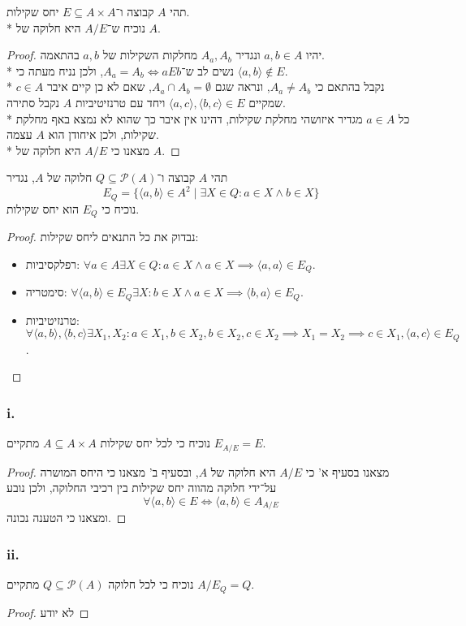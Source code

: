 \Question{}
\Subquestion{}
תהי $A$ קבוצה ו־$E \subseteq A \times A$ יחס שקילות. \\*
נוכיח ש־$A / E$ היא חלוקה של $A$.
\begin{proof}
	יהיו $a, b \in A$ ונגדיר $A_a, A_b$ מחלקות השקילות של $a, b$ בהתאמה. \\*
	נשים לב ש־$A_a = A_b \iff aEb$, ולכן נניח מעתה כי $\langle a, b \rangle \not\in E$. \\*
	נקבל בהתאם כי $A_a \ne A_b$, ונראה שגם $A_a \cap A_b = \emptyset$, שאם לא כן קיים איבר $c \in A$ שמקיים $\langle a, c \rangle, \langle b, c \rangle \in E$ ויחד עם טרנזיטיביות $A$ נקבל סתירה. \\*
	כל $a \in A$ מגדיר איזושהי מחלקת שקילות, דהינו אין איבר כך שהוא לא נמצא באף מחלקת שקילות, ולכן איחודן הוא $A$ עצמה. \\*
	מצאנו כי $A/E$ היא חלוקה של $A$.
\end{proof}

\Subquestion{}
תהי $A$ קבוצה ו־$Q \subseteq \mathcal{P}(A)$ חלוקה של $A$, נגדיר
\[
	E_Q = \{ \langle a, b \rangle \in A^2 \mid \exists X \in Q : a \in X \land b \in X \}
\]
נוכיח כי $E_Q$ הוא יחס שקילות.
\begin{proof}
	נבדוק את כל התנאים ליחס שקילות:
	\begin{itemize}
		\item רפלקסיביות: $\forall a \in A \exists X \in Q : a \in X \land a \in X \implies \langle a, a \rangle \in E_Q$.
		\item סימטריה: $\forall \langle a, b \rangle \in E_Q \exists X : b \in X \land a \in X \implies \langle b, a \rangle \in E_Q$.
		\item טרנזיטיביות: $\forall \langle a, b \rangle, \langle b, c \rangle \exists X_1, X_2 : a \in X_1, b \in X_2, b \in X_2, c \in X_2 \implies X_1 = X_2 \implies c \in X_1, \langle a, c \rangle \in E_Q$.
	\end{itemize}
\end{proof}

\Subquestion{}
\subsubsection{i.}
נוכיח כי לכל יחס שקילות $A \subseteq A \times A$ מתקיים $E_{A/E} = E$.
\begin{proof}
	מצאנו בסעיף א' כי $A/E$ היא חלוקה של $A$, ובסעיף ב' מצאנו כי היחס המושרה על־ידי חלוקה מהווה יחס שקילות בין רכיבי החלוקה, ולכן נובע
	\[
		\forall \langle a, b \rangle \in E \iff \langle a, b \rangle \in A_{A/E}
	\]
	ומצאנו כי הטענה נכונה.
\end{proof}

\subsubsection{ii.}
נוכיח כי לכל חלוקה $Q \subseteq \mathcal{P}(A)$ מתקיים $A/E_Q = Q$.
\begin{proof}
	לא יודע
\end{proof}



